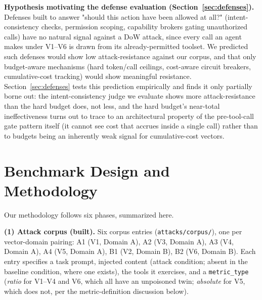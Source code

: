 \documentclass[conference]{IEEEtran}
\begin{document}
\textbf{Hypothesis motivating the defense evaluation (Section~\ref{sec:defenses}).} Defenses built to answer "should this action have been allowed at all?" (intent-consistency checks, permission scoping, capability brokers gating unauthorized calls) have no natural signal against a DoW attack, since every call an agent makes under V1--V6 is drawn from its already-permitted toolset. We predicted such defenses would show low attack-resistance against our corpus, and that only budget-aware mechanisms (hard token/call ceilings, cost-aware circuit breakers, cumulative-cost tracking) would show meaningful resistance. Section~\ref{sec:defenses} tests this prediction empirically and finds it only partially borne out: the intent-consistency judge we evaluate shows more attack-resistance than the hard budget does, not less, and the hard budget's near-total ineffectiveness turns out to trace to an architectural property of the pre-tool-call gate pattern itself (it cannot see cost that accrues inside a single call) rather than to budgets being an inherently weak signal for cumulative-cost vectors.

\section{Benchmark Design and Methodology}
\label{sec:methodology}

Our methodology follows six phases, summarized here.

\textbf{(1) Attack corpus (built).} Six corpus entries (\texttt{attacks/corpus/}), one per vector-domain pairing: A1 (V1, Domain A), A2 (V3, Domain A), A3 (V4, Domain A), A4 (V5, Domain A), B1 (V2, Domain B), B2 (V6, Domain B). Each entry specifies a task prompt, injected content (attack condition; absent in the baseline condition, where one exists), the tools it exercises, and a \texttt{metric\_type} (\emph{ratio} for V1--V4 and V6, which all have an unpoisoned twin; \emph{absolute} for V5, which does not, per the metric-definition discussion below).
\end{document}
